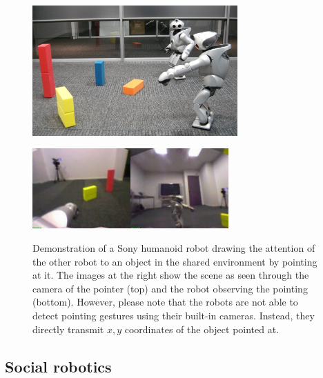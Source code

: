 \begin{figure}[t]
  \parbox{0.7\textwidth}{ \includegraphics[width=0.7\textwidth]{figures/qrio-pointing-photo-of-scene}
    
    \vspace{0.03\textwidth}\includegraphics[width=0.335\textwidth]{figures/qrio-pointing-camera-image-b}\hspace{0.03\textwidth}\includegraphics[width=0.335\textwidth]{figures/qrio-pointing-camera-image-a}
  }
  \caption{Demonstration of a Sony humanoid robot drawing the
    attention of the other robot to an object in the shared
    environment by pointing at it. The images at the right show the
    scene as seen through the camera of the pointer (top) and the
    robot observing the pointing (bottom). However, please note that
    the robots are not able to detect pointing gestures using their
    built-in cameras. Instead, they directly transmit $x,y$
    coordinates of the object pointed at.}
  \label{f:qrio-pointing}
\end{figure}

\subsection{Social robotics}

